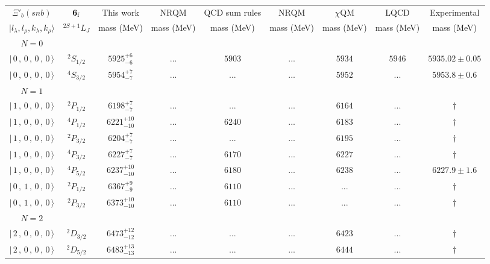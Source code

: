 \begin{tabular}{c c| c c c c c c c}\hline \hline
$\Xi'_{b}(snb)$& ${\bf {6}}_{\rm f}$& This work   &   NRQM \cite{Yoshida2015}     &  QCD sum rules \cite{Liu2008, Mao2015, Chen2016}      &  NRQM \cite{Roberts2008}    & $\chi$QM \cite{Kim2021}        & LQCD \cite{Mohanta2020}     & Experimental  \\ 
 $\vert l_{\lambda}, l_{\rho}, k_{\lambda}, k_{\rho} \rangle$ & $^{2S+1}L_{J}$ & mass (MeV)  &   mass (MeV)  &  mass (MeV)  &  mass (MeV) & mass (MeV) & mass (MeV) &      mass (MeV) \\ \hline
\hline
 $N=0$  &  &  &  &  &  \\ 
$\vert \,0\,,\,0\,,\,0\,,\,0 \,\rangle $ & $^{2}S_{1/2}$ & $5925^{+6}_{-6}$ & ... & $5903$ & ... & $5934$ & $5946$ & $5935.02\pm 0.05$ \\ 
$\vert \,0\,,\,0\,,\,0\,,\,0 \,\rangle $ & $^{4}S_{3/2}$ & $5954^{+7}_{-7}$ & ... & ... & ... & $5952$ & ... & $5953.8\pm 0.6$ \\ 
\hline
 $N=1$  &  &  &  &  &  \\ 
$\vert \,1\,,\,0\,,\,0\,,\,0 \,\rangle $ & $^{2}P_{1/2}$ & $6198^{+7}_{-7}$ & ... & ... & ... & $6164$ & ... & $\dagger$ \\ 
$\vert \,1\,,\,0\,,\,0\,,\,0 \,\rangle $ & $^{4}P_{1/2}$ & $6221^{+10}_{-10}$ & ... & $6240$ & ... & $6183$ & ... & $\dagger$ \\ 
$\vert \,1\,,\,0\,,\,0\,,\,0 \,\rangle $ & $^{2}P_{3/2}$ & $6204^{+7}_{-7}$ & ... & ... & ... & $6195$ & ... & $\dagger$ \\ 
$\vert \,1\,,\,0\,,\,0\,,\,0 \,\rangle $ & $^{4}P_{3/2}$ & $6227^{+7}_{-7}$ & ... & $6170$ & ... & $6227$ & ... & $\dagger$ \\ 
$\vert \,1\,,\,0\,,\,0\,,\,0 \,\rangle $ & $^{4}P_{5/2}$ & $6237^{+10}_{-10}$ & ... & $6180$ & ... & $6238$ & ... & $6227.9\pm 1.6$ \\ 
$\vert \,0\,,\,1\,,\,0\,,\,0 \,\rangle $ & $^{2}P_{1/2}$ & $6367^{+9}_{-9}$ & ... & $6110$ & ... & ... & ... & $\dagger$ \\ 
$\vert \,0\,,\,1\,,\,0\,,\,0 \,\rangle $ & $^{2}P_{3/2}$ & $6373^{+10}_{-10}$ & ... & $6110$ & ... & ... & ... & $\dagger$ \\ 
\hline
 $N=2$  &  &  &  &  &  \\ 
$\vert \,2\,,\,0\,,\,0\,,\,0 \,\rangle $ & $^{2}D_{3/2}$ & $6473^{+12}_{-12}$ & ... & ... & ... & $6423$ & ... & $\dagger$ \\ 
$\vert \,2\,,\,0\,,\,0\,,\,0 \,\rangle $ & $^{2}D_{5/2}$ & $6483^{+13}_{-13}$ & ... & ... & ... & $6444$ & ... & $\dagger$ \\ 

\end{tabular}
